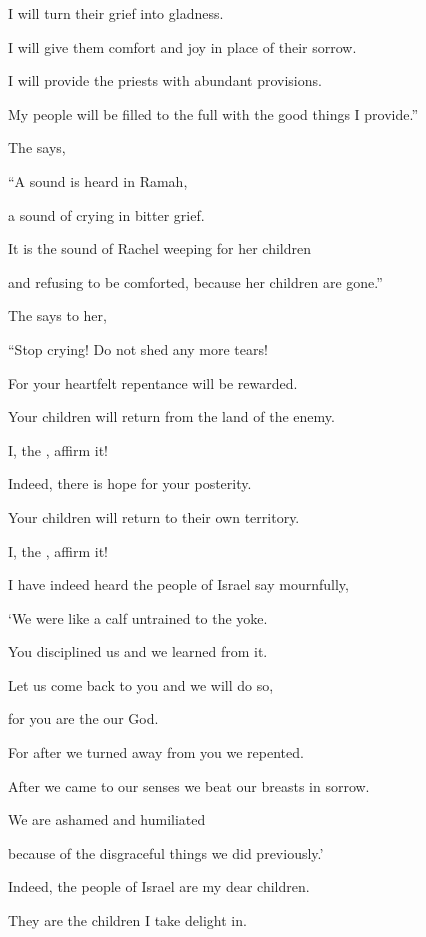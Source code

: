 {\par }{\Q I will turn
their grief
into gladness.
\par }{\Q I will give them comfort
and joy
in place of their sorrow.
\par }{\Q {}I will provide
the priests
with abundant provisions.
\par }{\Q My people
will be filled
to the full with
the good things I provide.”
\par }{\PP {}The
{}
says,
\par }{\Q “A sound
is heard
in Ramah,
\par }{\Q a sound
of crying
in bitter
grief.
\par }{\Q It is the sound of Rachel
weeping
for her
children
\par }{\Q and refusing to be comforted,
because
her children
are gone.”
\par }{\Q {}The
{}
says
to her,

\par }{\Q “Stop
crying! Do not shed any more tears!

\par }{\Q For
your heartfelt
repentance will be rewarded.
\par }{\Q Your children will return
from the land
of the enemy.
\par }{\Q I, the
{}, affirm it!
\par }{\Q {}Indeed, there is
hope
for your posterity.
\par }{\Q Your children
will return
to their own territory.
\par }{\Q I, the
{}, affirm it!
\par }{\Q {}I have indeed heard
the people of Israel
say mournfully,
\par }{\Q ‘We were like a calf
untrained to the yoke.

\par }{\Q You disciplined
us and we learned
from it.

\par }{\Q Let us come back
to you and we will do so,

\par }{\Q for
you
are the
{}
our God.
\par }{\Q {}For
after
we turned
away from you we
repented.
\par }{\Q After
we came to our senses
we beat our breasts in sorrow.
\par }{\Q We are ashamed
and humiliated
\par }{\Q because
of the disgraceful
things we did previously.’
\par }{\Q {}Indeed,
the people of Israel
are my dear
children.
\par }{\Q They are the children
I take delight
in.

}
